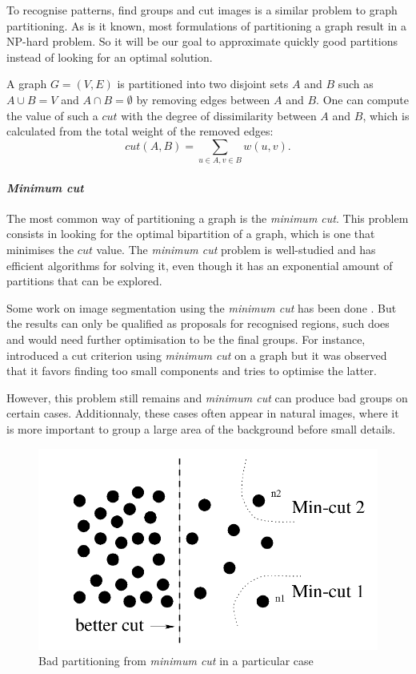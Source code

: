 To recognise patterns, find groups and cut images is a similar problem to graph partitioning.
As is it known, most formulations of partitioning a graph result in a NP-hard problem.
So it will be our goal to approximate quickly good partitions instead of looking for an optimal solution.

A graph \(G = (V, E)\) is partitioned into two disjoint sets \(A\) and \(B\) such as \(A \cup B = V\) and \(A \cap B = \emptyset\) by removing edges between \(A\) and \(B\).
One can compute the value of such a \(cut\) with the degree of dissimilarity between \(A\) and \(B\), which is calculated from the total weight of the removed edges:
\[cut(A, B) = \sum_{u\in A, v\in B} w(u, v).\]

\paragraph{\textit{Minimum cut}}

The most common way of partitioning a graph is the \textit{minimum cut}.
This problem consists in looking for the optimal bipartition of a graph, which is one that minimises the \(cut\) value.
The \textit{minimum cut} problem is well-studied and has efficient algorithms for solving it, even though it has an exponential amount of partitions that can be explored.

Some work on image segmentation using the \textit{minimum cut} has been done \cite{wu_optimal_1993} \cite{estrada_spectral_2004} \cite{felzenszwalb_efficient_2004}.
But the results can only be qualified as proposals for recognised regions, such does \cite{estrada_spectral_2004} and would need further optimisation to be the final groups.
For instance, \cite{wu_optimal_1993} introduced a cut criterion using \textit{minimum cut} on a graph but it was observed that it favors finding too small components and \cite{felzenszwalb_efficient_2004} tries to optimise the latter.

However, this problem still remains and \textit{minimum cut} can produce bad groups on certain cases.
Additionnaly, these cases often appear in natural images, where it is more important to group a large area of the background before small details.

\begin{figure}[!htbp]
 \centering
  \includegraphics[width=\textwidth]{img/mincutproblem.png}
 \caption{Bad partitioning from \textit{minimum cut} in a particular case \cite{shi_normalized_2000}}
\end{figure}

